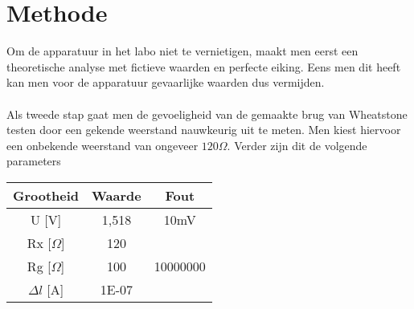 \section{Methode}

Om de apparatuur in het labo niet te vernietigen, maakt men
eerst een theoretische analyse met fictieve waarden en 
perfecte eiking. Eens men dit heeft kan men voor de apparatuur
gevaarlijke waarden dus vermijden.
\\ \\
Als tweede stap gaat men de gevoeligheid van de gemaakte brug
van Wheatstone testen door een gekende weerstand nauwkeurig uit
te meten. Men kiest hiervoor een onbekende weerstand van
ongeveer $120 \Omega$. Verder zijn dit de volgende parameters

\begin{tabular}{| c | c | c |}
    \hline
    Grootheid       & Waarde    & Fout \\ \hline
    U [V]           & 1,518     & 10mV \\ \hline
    Rx [$\Omega$]   & 120       &      \\ \hline
    Rg [$\Omega$]   & 100       & 10000000 \\ \hline
    $\Delta l$ [A]  & 1E-07     &      \\ \hline
\end{tabular}